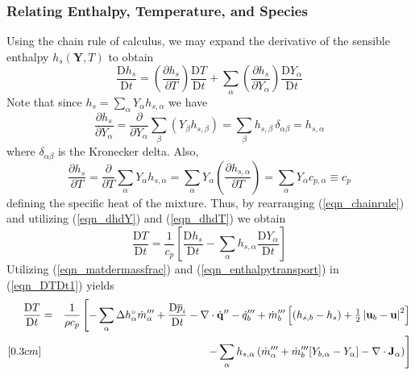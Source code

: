 \subsubsection{Relating Enthalpy, Temperature, and Species}
\label{eqn_enthalpy_temperature}

Using the chain rule of calculus, we may expand the derivative of the sensible enthalpy $h_s(\mathbf{Y},T)$ to obtain
\begin{equation}
\label{eqn_chainrule}
\frac{\mbox{D} h_s}{\mbox{D} t} = \left(\frac{\partial h_s}{\partial T}\right) \frac{\mbox{D} T }{\mbox{D} t} +
\sum_\alpha \left( \frac{\partial h_s}{\partial Y_\alpha} \right) \frac{\mbox{D} Y_\alpha }{\mbox{D} t}
\end{equation}
Note that since $h_s = \sum_\alpha Y_\alpha h_{s,\alpha}$ we have
\begin{equation}
\label{eqn_dhdY}
\frac{\partial h_s}{\partial Y_\alpha} = \frac{\partial}{\partial Y_\alpha} \sum_\beta (Y_\beta h_{s,\beta} )
= \sum_\beta h_{s,\beta} \,\delta_{\alpha \beta} = h_{s,\alpha}
\end{equation}
where $\delta_{\alpha \beta}$ is the Kronecker delta. Also,
\begin{equation}
\label{eqn_dhdT}
\frac{\partial h_s}{\partial T} = \frac{\partial}{\partial T} \sum_\alpha Y_\alpha h_{s,\alpha} =
\sum_\alpha Y_\alpha \left(\frac{\partial h_{s,\alpha}}{\partial T}\right) = \sum_\alpha Y_\alpha c_{p,\alpha} \equiv c_p
\end{equation}
defining the specific heat of the mixture.  Thus, by rearranging (\ref{eqn_chainrule}) and utilizing (\ref{eqn_dhdY}) and (\ref{eqn_dhdT}) we obtain
\begin{equation}
\label{eqn_DTDt1}
\frac{\mbox{D} T}{\mbox{D} t} = \frac{1}{c_p} \left[ \frac{\mbox{D} h_s}{\mbox{D} t} - \sum_\alpha h_{s,\alpha} \frac{\mbox{D} Y_\alpha}{\mbox{D} t} \right]
\end{equation}
Utilizing (\ref{eqn_matdermassfrac}) and (\ref{eqn_enthalpytransport}) in (\ref{eqn_DTDt1}) yields
\begin{eqnarray}
\frac{\mbox{D} T}{\mbox{D} t} &=& \frac{1}{\rho c_p}   \left[  -\sum_\alpha \Delta h^\circ_\alpha \dot{m}_{\alpha}^{{\prime\prime\prime}} + \frac{\mbox{D} \overline{p}_i }{\mbox{D} t} - \nabla\cdot\dot{\mathbf{q}}^{\prime\prime} - \dot{q}_b^{\prime\prime\prime} + \dot{m}_{b}^{{\prime\prime\prime}} \left[ ( h_{s,b} - h_s )  + \mbox{$\frac{1}{2}$} \left|\mathbf{u}_b-\mathbf{u}\right|^2 \right] \right.   \nonumber\\ [0.3cm]
& &  \quad\quad\,\, \left. - \sum_\alpha h_{s,\alpha} \left( \dot{m}_\alpha^{{\prime\prime\prime}} + \dot{m}_{b}^{{\prime\prime\prime}}[Y_{b,\alpha} - Y_\alpha] - \nabla\cdot \mathbf{J}_{\alpha} \right)  \right]
\label{eqn_DTDt2}
\end{eqnarray}
